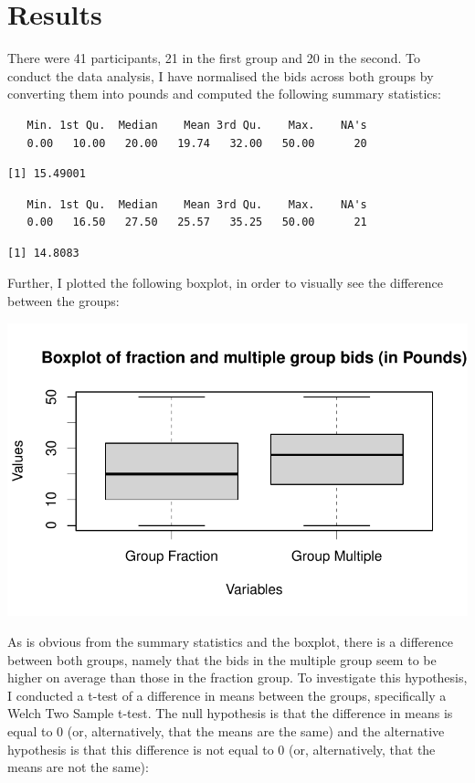 \documentclass[
]{report}
\begin{document}
\chapter{Results}\label{results}

There were 41 participants, 21 in the first group and 20 in the second.
To conduct the data analysis, I have normalised the bids across both
groups by converting them into pounds and computed the following summary
statistics:

\begin{verbatim}
   Min. 1st Qu.  Median    Mean 3rd Qu.    Max.    NA's 
   0.00   10.00   20.00   19.74   32.00   50.00      20 
\end{verbatim}

\begin{verbatim}
[1] 15.49001
\end{verbatim}

\begin{verbatim}
   Min. 1st Qu.  Median    Mean 3rd Qu.    Max.    NA's 
   0.00   16.50   27.50   25.57   35.25   50.00      21 
\end{verbatim}

\begin{verbatim}
[1] 14.8083
\end{verbatim}

Further, I plotted the following boxplot, in order to visually see the
difference between the groups:

\includegraphics{paper_files/figure-pdf/unnamed-chunk-2-1.pdf}

As is obvious from the summary statistics and the boxplot, there is a
difference between both groups, namely that the bids in the multiple
group seem to be higher on average than those in the fraction group. To
investigate this hypothesis, I conducted a t-test of a difference in
means between the groups, specifically a Welch Two Sample t-test. The
null hypothesis is that the difference in means is equal to 0 (or,
alternatively, that the means are the same) and the alternative
hypothesis is that this difference is not equal to 0 (or, alternatively,
that the means are not the same):
\end{document}
